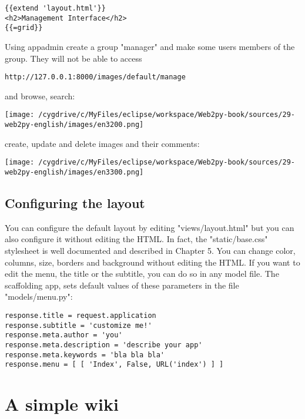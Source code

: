 \documentclass[justified,sixbynine,notoc]{tufte-book}
\begin{document}
\begin{fullwidth}
\begin{lstlisting}[keywords={}]
{{extend 'layout.html'}}
<h2>Management Interface</h2>
{{=grid}}
\end{lstlisting}

Using appadmin create a group "manager" and make some users members of the group. They will not be able to access

\begin{lstlisting}[keywords={}]
http://127.0.0.1:8000/images/default/manage
\end{lstlisting}
\noindent and browse, search:


\goodbreak\begin{center}\texttt{[image: /cygdrive/c/MyFiles/eclipse/workspace/Web2py-book/sources/29-web2py-english/images/en3200.png]}\end{center}

\noindent create, update and delete images and their comments:


\goodbreak\begin{center}\texttt{[image: /cygdrive/c/MyFiles/eclipse/workspace/Web2py-book/sources/29-web2py-english/images/en3300.png]}\end{center}


\goodbreak\subsection{Configuring the layout}

You can configure the default layout by editing "views/layout.html" but you can also configure it without editing the HTML. In fact, the "static/base.css" stylesheet is well documented and described in Chapter 5. You can change color, columns, size, borders and background without editing the HTML. If you want to edit the menu, the title or the subtitle, you can do so in any model file. The scaffolding app, sets default values of these parameters in the file "models/menu.py":

\begin{lstlisting}
response.title = request.application
response.subtitle = 'customize me!'
response.meta.author = 'you'
response.meta.description = 'describe your app'
response.meta.keywords = 'bla bla bla'
response.menu = [ [ 'Index', False, URL('index') ] ]
\end{lstlisting}

\goodbreak\section{A simple wiki}


\end{fullwidth}
\end{document}
